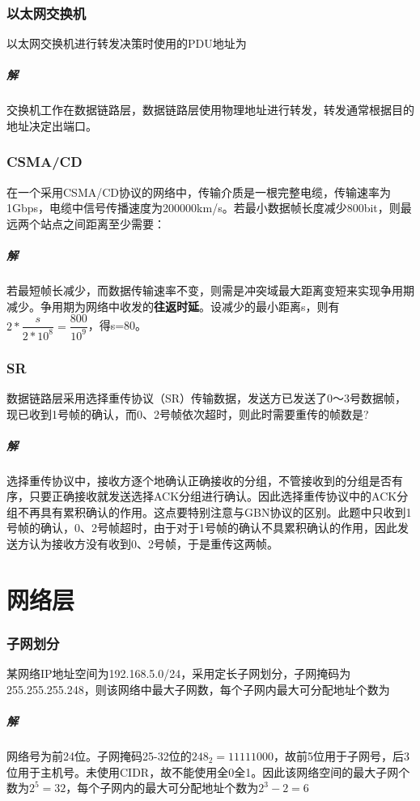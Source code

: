 \subsubsection{以太网交换机}
以太网交换机进行转发决策时使用的PDU地址为

\subparagraph{解}
交换机工作在数据链路层，数据链路层使用物理地址进行转发，转发通常根据目的地址决定出端口。


\subsubsection{CSMA/CD}
在一个采用CSMA/CD协议的网络中，传输介质是一根完整电缆，传输速率为1Gbps，电缆中信号传播速度为200000km/s。若最小数据帧长度减少800bit，则最远两个站点之间距离至少需要：

\subparagraph{解}
若最短帧长减少，而数据传输速率不变，则需是冲突域最大距离变短来实现争用期减少。争用期为网络中收发的\textbf{往返时延}。设减少的最小距离s，则有\(2 * \dfrac{s}{2 * 10^8} = \dfrac{800}{10^9}\)，得s=80。


\subsubsection{SR}
数据链路层采用选择重传协议（SR）传输数据，发送方已发送了0～3号数据帧，现已收到1号帧的确认，而0、2号帧依次超时，则此时需要重传的帧数是?

\subparagraph{解}
选择重传协议中，接收方逐个地确认正确接收的分组，不管接收到的分组是否有序，只要正确接收就发送选择ACK分组进行确认。因此选择重传协议中的ACK分组不再具有累积确认的作用。这点要特别注意与GBN协议的区别。此题中只收到1号帧的确认，0、2号帧超时，由于对于1号帧的确认不具累积确认的作用，因此发送方认为接收方没有收到0、2号帧，于是重传这两帧。


\section{网络层}

\subsubsection{子网划分}
某网络IP地址空间为192.168.5.0/24，采用定长子网划分，子网掩码为255.255.255.248，则该网络中最大子网数，每个子网内最大可分配地址个数为

\subparagraph{解}
网络号为前24位。子网掩码25-32位的\(248_2 = 11111000\)，故前5位用于子网号，后3位用于主机号。未使用CIDR，故不能使用全0全1。因此该网络空间的最大子网个数为\(2^5 = 32\)，每个子网内的最大可分配地址个数为\(2^3 - 2 = 6\)


